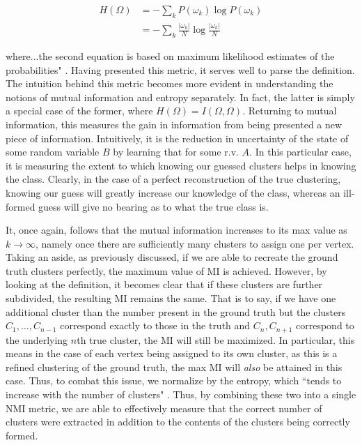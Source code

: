 \documentclass{article}
\begin{document}
\begin{align}
H(\Omega) &= -\sum_k P(\omega_k) \log P(\omega_k) \\
&= -\sum_k \frac{\vert\omega_k\vert}{N} \log \frac{\vert\omega_k\vert}{N}
\end{align}

where...the second equation is based on maximum likelihood estimates of the probabilities" \cite{evaluation}. Having presented this metric, it serves well to parse the definition. The intuition behind this metric becomes more evident in understanding the notions of mutual information and entropy separately. In fact, the latter is simply a special case of the former, where $H(\Omega) = I(\Omega,\Omega)$. Returning to mutual information, this measures the gain in information from being presented a new piece of information. Intuitively, it is the reduction in uncertainty of the state of some random variable $B$ by learning that for some r.v. $A$. In this particular case, it is measuring the extent to which knowing our guessed clusters helps in knowing the class. Clearly, in the case of a perfect reconstruction of the true clustering, knowing our guess will greatly increase our knowledge of the class, whereas an ill-formed guess will give no bearing as to what the true class is.

It, once again, follows that the mutual information increases to its max value as $k\rightarrow\infty$, namely once there are sufficiently many clusters to assign one per vertex. Taking an aside, as previously discussed, if we are able to recreate the ground truth clusters perfectly, the maximum value of MI is achieved. However, by looking at the definition, it becomes clear that if these clusters are further subdivided, the resulting MI remains the same. That is to say, if we have one additional cluster than the number present in the ground truth but the clusters $C_1,\dots,C_{n-1}$ correspond exactly to those in the truth and $C_n,C_{n+1}$ correspond to the underlying $n$th true cluster, the MI will still be maximized. In particular, this means in the case of each vertex being assigned to its own cluster, as this is a refined clustering of the ground truth, the max MI will \textit{also} be attained in this case. Thus, to combat this issue, we normalize by the entropy, which ``tends to increase with the number of clusters" \cite{evaluation}. Thus, by combining these two into a single NMI metric, we are able to effectively measure that the correct number of clusters were extracted in addition to the contents of the clusters being correctly formed.
\end{document}
